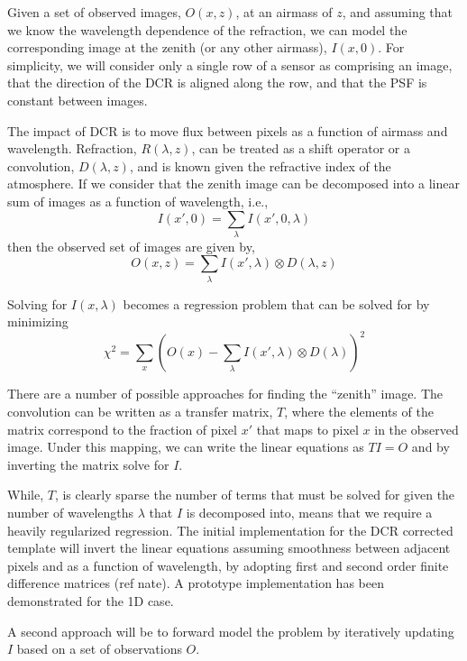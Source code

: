 Given a set of observed images, $O(x, z)$, at an airmass of $z$, and
assuming that we know the wavelength dependence of the refraction, we
can model the corresponding image at the zenith (or any other
airmass), $I(x, 0)$. For simplicity, we will consider only a single
row of a sensor as comprising an image, that the direction of the DCR
is aligned along the row, and that the PSF is constant between
images. 

The impact of DCR is to move flux between pixels as a function of airmass and wavelength. Refraction, $R(\lambda, z)$, can be treated as a shift operator or a convolution, $D(\lambda, z)$, and is known given the refractive index of the atmosphere.  If we consider that the zenith image can be decomposed into a linear sum of images as a function of wavelength, i.e.,
\begin{equation}
I(x', 0) = \sum_\lambda I(x', 0, \lambda) 
\end{equation}
then the observed set of images are given by,
\begin{equation}
O(x, z) = \sum_\lambda I(x',\lambda) \otimes D(\lambda, z) 
\label{eq:convDCR}
\end{equation}

Solving for $I(x,\lambda)$ becomes a regression problem that can be 
solved for by minimizing
\begin{equation}
\chi^2 = \sum_x (O(x) - \sum_\lambda I(x',\lambda) \otimes D(\lambda))^2 
\end{equation}

There are a number of possible approaches for finding the ``zenith''
image.  The convolution can be written as a transfer matrix, $T$,
where the elements of the matrix correspond to the fraction of pixel $x'$ that maps to pixel $x$ in the observed image. Under this mapping, we can write the linear equations as $TI=O$ and by inverting the matrix solve for $I$. 

While,  $T$, is clearly sparse the number of terms that must be solved for given the number of wavelengths $\lambda$ that $I$ is decomposed into, means that we require a heavily regularized regression. The initial implementation for the DCR corrected template will invert the linear equations assuming smoothness between adjacent pixels and as a function of wavelength, by adopting first and second
order finite difference matrices (ref nate).  A prototype implementation has been demonstrated for the 1D case.  

A second approach will be to forward model the problem by iteratively updating
$I$ based on a set of observations $O$.

